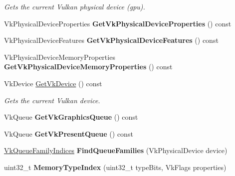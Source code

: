 \begin{DoxyCompactItemize}
\begin{DoxyCompactList}\small\item\em Gets the current Vulkan physical device (gpu). \end{DoxyCompactList}\item 
\mbox{\label{class_flounder_1_1_display_a9258842139cc1cdfc2ee0fa9ad05d28e}} 
Vk\+Physical\+Device\+Properties {\bfseries Get\+Vk\+Physical\+Device\+Properties} () const
\item 
\mbox{\label{class_flounder_1_1_display_a7a8ae9d17667e1288465beed14477197}} 
Vk\+Physical\+Device\+Features {\bfseries Get\+Vk\+Physical\+Device\+Features} () const
\item 
\mbox{\label{class_flounder_1_1_display_a01e249116cbbac71399d91c39726235b}} 
Vk\+Physical\+Device\+Memory\+Properties {\bfseries Get\+Vk\+Physical\+Device\+Memory\+Properties} () const
\item 
Vk\+Device \hyperlink{class_flounder_1_1_display_ac149030bd842db3be3337a9488d83bf4}{Get\+Vk\+Device} () const
\begin{DoxyCompactList}\small\item\em Gets the current Vulkan device. \end{DoxyCompactList}\item 
\mbox{\label{class_flounder_1_1_display_a499f52a30dff303dbd79c38209eda33b}} 
Vk\+Queue {\bfseries Get\+Vk\+Graphics\+Queue} () const
\item 
\mbox{\label{class_flounder_1_1_display_a07a9bf9f1dde56fe3ad1bf643a0ae42c}} 
Vk\+Queue {\bfseries Get\+Vk\+Present\+Queue} () const
\item 
\mbox{\label{class_flounder_1_1_display_a526a834ea8c2bbaa1ea7c6c24bd8bad8}} 
\hyperlink{struct_flounder_1_1_vk_queue_family_indices}{Vk\+Queue\+Family\+Indices} {\bfseries Find\+Queue\+Families} (Vk\+Physical\+Device device)
\item 
\mbox{\label{class_flounder_1_1_display_a333f807927fb2e4cb3a8bfdcbc919d64}} 
uint32\+\_\+t {\bfseries Memory\+Type\+Index} (uint32\+\_\+t type\+Bits, Vk\+Flags properties)
\end{DoxyCompactItemize}
